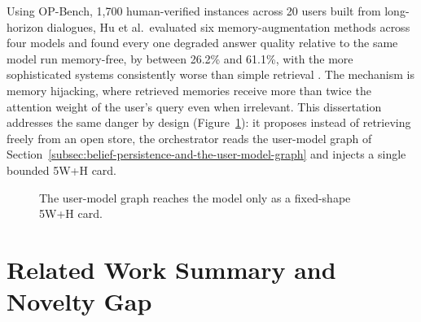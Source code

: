 Using OP-Bench, 1,700 human-verified instances across 20 users built from long-horizon dialogues, Hu et al.\ evaluated six memory-augmentation methods across four models and found every one degraded answer quality relative to the same model run memory-free, by between 26.2\% and 61.1\%, with the more sophisticated systems consistently worse than simple retrieval \cite{hu2026opbenchbenchmarkingoverpersonalizationmemoryaugmented}. The mechanism is memory hijacking, where retrieved memories receive more than twice the attention weight of the user's query even when irrelevant. This dissertation addresses the same danger by design (Figure~\ref{fig:memory-architecture}): it proposes instead of retrieving freely from an open store, the orchestrator reads the user-model graph of Section~\ref{subsec:belief-persistence-and-the-user-model-graph} and injects a single bounded 5W+H card. 

\begin{figure}[H]
  \centering
  \caption{The user-model graph reaches the model only as a fixed-shape 5W+H card.}
  \label{fig:memory-architecture}
\end{figure}

\section{Related Work Summary and Novelty Gap}
\label{sec:related-work-summary-and-novelty-gap}

